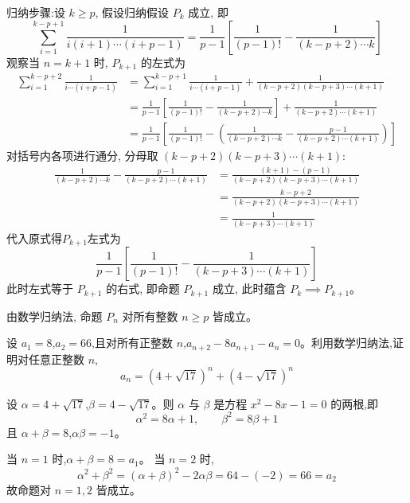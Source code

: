 \begin{questions}
\begin{solution}
        归纳步骤:设 $k \ge p$, 假设归纳假设 $P_k$ 成立, 即
        \[
        \sum_{i=1}^{k-p+1} \frac{1}{i(i+1)\cdots(i+p-1)} = \frac{1}{p-1} \left[ \frac{1}{(p-1)!} - \frac{1}{(k-p+2)\cdots k} \right]
        \]
        观察当 $n = k + 1$ 时, $P_{k+1}$ 的左式为
        \begin{align}
        \sum_{i=1}^{k-p+2} \frac{1}{i \cdots (i+p-1)} 
        &= \sum_{i=1}^{k-p+1} \frac{1}{i \cdots (i+p-1)} + \frac{1}{(k-p+2)(k-p+3) \cdots (k+1)} \\
        &= \frac{1}{p-1} \left[ \frac{1}{(p-1)!} - \frac{1}{(k-p+2) \cdots k} \right] + \frac{1}{(k-p+2) \cdots (k+1)} \\
        &= \frac{1}{p-1} \left[ \frac{1}{(p-1)!} - \left( \frac{1}{(k-p+2) \cdots k} - \frac{p-1}{(k-p+2) \cdots (k+1)} \right) \right]
        \end{align}
        对括号内各项进行通分, 分母取 $(k-p+2)(k-p+3) \cdots (k+1)$:
        \begin{align}
        \frac{1}{(k-p+2) \cdots k} - \frac{p-1}{(k-p+2) \cdots (k+1)} 
        &= \frac{(k+1) - (p-1)}{(k-p+2)(k-p+3) \cdots (k+1)} \\
        &= \frac{k-p+2}{(k-p+2)(k-p+3) \cdots (k+1)} \\
        &= \frac{1}{(k-p+3) \cdots (k+1)}
        \end{align}
        代入原式得$P_{k+1}$左式为
        \[
        \frac{1}{p-1} \left[ \frac{1}{(p-1)!} - \frac{1}{(k-p+3) \cdots (k+1)} \right]
        \]
        此时左式等于 $P_{k+1}$ 的右式, 即命题 $P_{k+1}$ 成立, 此时蕴含 $P_k \implies P_{k+1}$。

        由数学归纳法, 命题 $P_n$ 对所有整数 $n \ge p$ 皆成立。
    \end{solution}

    \question
设 $a_{1}=8$,$a_{2}=66$,且对所有正整数 $n$,$a_{n+2}-8a_{n+1}-a_{n}=0$。利用数学归纳法,证明对任意正整数 $n$,
\[
a_{n}=\left(4+\sqrt{17}\right)^{n}+\left(4-\sqrt{17}\right)^{n}
\]

\begin{solution}
设 $\alpha=4+\sqrt{17}$,$\beta=4-\sqrt{17}$。则 $\alpha$ 与 $\beta$ 是方程 $x^{2}-8x-1=0$ 的两根,即
\[
\alpha^{2}=8\alpha+1,\qquad\beta^{2}=8\beta+1
\]
且 $\alpha+\beta=8$,$\alpha\beta=-1$。

当 $n=1$ 时,$\alpha+\beta=8=a_{1}$。
当 $n=2$ 时,
\[
\alpha^{2}+\beta^{2}=(\alpha+\beta)^{2}-2\alpha\beta=64-(-2)=66=a_{2}
\]
故命题对 $n=1,2$ 皆成立。


\end{solution}
\end{questions}
